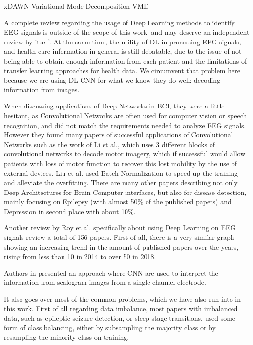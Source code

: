 \documentclass[conference]{IEEEtran}
\begin{document}
xDAWN
Variational Mode Decomposition VMD

A complete review regarding the usage of Deep Learning methods to identify EEG signals is outside of the scope of this work, and may deserve an independent review by itself.  At the same time, the utility of DL in processing EEG signals, and health care information in general is still debatable, due to the issue of not being able to obtain enough information from each patient and the limitations of transfer learning approaches for health data.  We circumvent that problem here because we are using DL-CNN for what we know they do well: decoding information from images.

When discussing applications of Deep Networks in BCI, they were a little hesitant, as Convolutional Networks are often used for computer vision or speech recognition, and did not match the requirements needed to analyze EEG signals. However they found many papers of successful applications of Convolutional Networks such as the work of Li et al.\cite{LI8709723}, which uses 3 different blocks of convolutional networks to decode motor imagery, which if successful would allow patients with loss of motor function to recover this lost mobility by the use of external devices. Liu et al. \cite{LIU2018288} used Batch Normalization to speed up the training and alleviate the overfitting. There are many other papers describing not only Deep Architectures for Brain Computer interfaces, but also for disease detection, mainly focusing on Epilepsy (with almost  50\% of the published papers) and Depression in second place with about 10\%.

Another review by Roy et al.\cite{RoyReview} specifically about using Deep Learning on EEG signals review a total of 156 papers. First of all, there is a very similar graph showing an increasing trend in the amount of published papers over the years, rising from less than 10 in 2014 to over 50 in 2018.

Authors in \cite{Singh.2021} presented an approach where CNN are used to interpret the information from scalogram images from a single channel electrode.


It also goes over most of the common problems, which we have also run into in this work. First of all regarding data imbalance, most papers with imbalanced data, such as epileptic seizure detection, or sleep stage transitions, used some form of class balancing, either by subsampling the majority class or by resampling the minority class on training.
\end{document}
